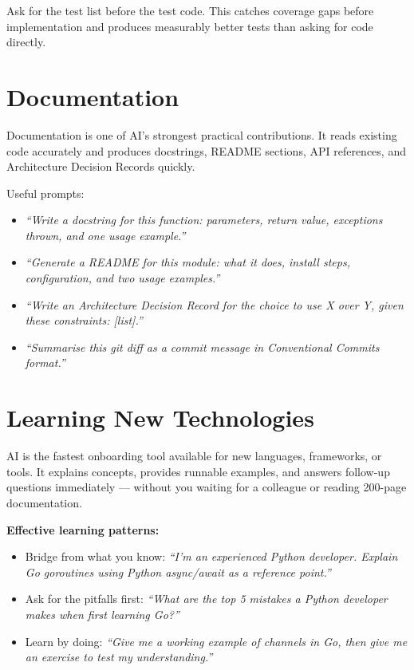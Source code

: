 \begin{tipbox}
Ask for the test list before the test code.
This catches coverage gaps before implementation and produces measurably better tests
than asking for code directly.
\end{tipbox}

\section{Documentation}
\label{sec:documentation}

Documentation is one of AI's strongest practical contributions.
It reads existing code accurately and produces docstrings, README sections, API
references, and Architecture Decision Records quickly.

Useful prompts:
\begin{itemize}
  \item \textit{``Write a docstring for this function: parameters, return value, exceptions thrown, and one usage example.''}
  \item \textit{``Generate a README for this module: what it does, install steps, configuration, and two usage examples.''}
  \item \textit{``Write an Architecture Decision Record for the choice to use X over Y, given these constraints: [list].''}
  \item \textit{``Summarise this git diff as a commit message in Conventional Commits format.''}
\end{itemize}

\section{Learning New Technologies}
\label{sec:learning}

AI is the fastest onboarding tool available for new languages, frameworks, or tools.
It explains concepts, provides runnable examples, and answers follow-up questions
immediately --- without you waiting for a colleague or reading 200-page documentation.

\textbf{Effective learning patterns:}
\begin{itemize}
  \item Bridge from what you know:
    \textit{``I'm an experienced Python developer. Explain Go goroutines using Python
    async/await as a reference point.''}
  \item Ask for the pitfalls first:
    \textit{``What are the top 5 mistakes a Python developer makes when first learning Go?''}
  \item Learn by doing:
    \textit{``Give me a working example of channels in Go, then give me an exercise to
    test my understanding.''}
\end{itemize}

